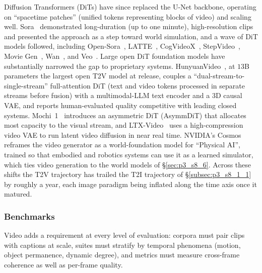 Diffusion Transformers (DiTs) have since replaced the U-Net backbone, operating on ``spacetime patches'' (unified tokens representing blocks of video) and scaling well. Sora~\cite{sora2024} demonstrated long-duration (up to one minute), high-resolution clips and presented the approach as a step toward world simulation, and a wave of DiT models followed, including Open-Sora~\cite{zheng2024open}, LATTE~\cite{ma2024latte}, CogVideoX~\cite{yang2024cogvideox}, StepVideo~\cite{ma2025stepvideot2vtechnicalreportpractice}, Movie Gen~\cite{polyak2024movie}, Wan~\cite{wan2025wan}, and Veo~\cite{DeepMindVeo}.
Large open DiT foundation models have substantially narrowed the gap to proprietary systems. HunyuanVideo~\cite{kong2024hunyuanvideo}, at $13$B parameters the largest open T2V model at release, couples a ``dual-stream-to-single-stream'' full-attention DiT (text and video tokens processed in separate streams before fusion) with a multimodal-LLM text encoder and a 3D causal VAE, and reports human-evaluated quality competitive with leading closed systems. Mochi~1~\cite{genmo2024mochi} introduces an asymmetric DiT (AsymmDiT) that allocates most capacity to the visual stream, and LTX-Video~\cite{hacohen2024ltxvideo} uses a high-compression video VAE to run latent video diffusion in near real time. NVIDIA's Cosmos~\cite{nvidia2025cosmos} reframes the video generator as a world-foundation model for ``Physical AI'', trained so that embodied and robotics systems can use it as a learned simulator, which ties video generation to the world models of §\ref{sec:p3_s8_6}.
Across these shifts the T2V trajectory has trailed the T2I trajectory of §\ref{subsec:p3_s8_1_1} by roughly a year, each image paradigm being inflated along the time axis once it matured.

\subsubsection{Benchmarks}
\label{subsubsec:p3_s8_3_1_benchmarks}
Video adds a requirement at every level of evaluation: corpora must pair clips with captions at scale, suites must stratify by temporal phenomena (motion, object permanence, dynamic degree), and metrics must measure cross-frame coherence as well as per-frame quality.

